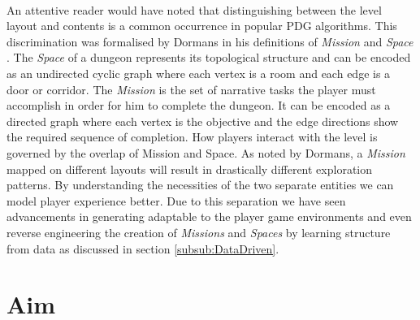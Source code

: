 \documentclass{UoYCSproject}
\begin{document}
\paragraph{}
An attentive reader would have noted that distinguishing between the level layout and contents is a common occurrence in popular PDG algorithms. This discrimination was formalised by Dormans in his definitions of \textit{Mission} and \textit{Space} \parencite{DormansMS}.
The \textit{Space} of a dungeon represents its topological structure and can be encoded as an undirected cyclic graph where each vertex is a room and each edge is a door or corridor. The \textit{Mission} is the set of narrative tasks the player must accomplish in order for him to complete the dungeon. It can be encoded as a directed graph where each vertex is the objective and the edge directions show the required sequence of completion. How players interact with the level is governed by the overlap of Mission and Space. As noted by Dormans, a \textit{Mission} mapped on different layouts will result in drastically different exploration patterns. By understanding the necessities of the two separate entities we can model player experience better. Due to this separation we have seen advancements in generating adaptable to the player game environments \parencite{DormansAE} and even reverse engineering the creation of \textit{Missions} and \textit{Spaces} by learning structure from data as discussed in section \ref{subsub:DataDriven}.

\section{Aim}
\label{sec:Aim}
\end{document}
